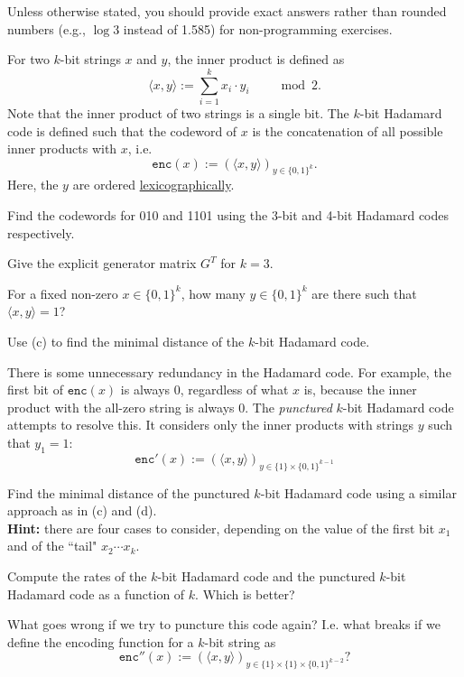 \documentclass[a4paper,10pt,landscape,twocolumn]{scrartcl}
\begin{document}
\homeworkproblems

{\sffamily\noindent
Unless otherwise stated, you should provide exact answers rather than rounded numbers (e.g., $\log 3$ instead of 1.585) for non-programming exercises.
}

\newcommand{\ip}[2]{\langle #1, #2\rangle}
\begin{exercise}
For two $k$-bit strings $x$ and $y$, the inner product is defined as
\[
\ip{x}{y} := \sum_{i=1}^k x_i\cdot y_i \ \ \ \ \ \ \ \ \mod 2.
\]
Note that the inner product of two strings is a single bit. The $k$-bit Hadamard code is defined such that the codeword of $x$ is the concatenation of all possible inner products with $x$, i.e.
\[
\mathtt{enc}(x) := \left(\ip{x}{y}\right)_{y \in \{0,1\}^k}.
\]
Here, the $y$ are ordered \href{https://en.wikipedia.org/wiki/Lexicographical_order}{lexicographically}.
	\begin{subex}[(1pt)]
	Find the codewords for 010 and 1101 using the 3-bit and 4-bit Hadamard codes respectively.
	\end{subex}
	\begin{subex}[(1pt)]
	Give the explicit generator matrix $G^T$ for $k = 3$.
	\end{subex}
	\begin{subex}[(2pt)]
	For a fixed non-zero $x \in \{0,1\}^k$, how many $y \in \{0,1\}^k$ are there such that $\ip{x}{y} = 1$?
	\end{subex}
	\begin{subex}[(1pt)]
	Use (c) to find the minimal distance of the $k$-bit Hadamard code.
	\end{subex}
There is some unnecessary redundancy in the Hadamard code. For example, the first bit of $\mathtt{enc}(x)$ is always 0, regardless of what $x$ is, because the inner product with the all-zero string is always 0. The \emph{punctured} $k$-bit Hadamard code attempts to resolve this. It considers only the inner products with strings $y$ such that $y_1 = 1$:
\[
\mathtt{enc}'(x) := \left(\ip{x}{y}\right)_{y \in \{1\} \times \{0,1\}^{k-1}}
\]
	\begin{subex}[(3pt)]
	Find the minimal distance of the punctured $k$-bit Hadamard code using a similar approach as in (c) and (d).
	\\\textbf{Hint:} there are four cases to consider, depending on the value of the first bit $x_1$ and of the ``tail" $x_2\cdots x_k$.
	\end{subex}
	\begin{subex}[(2pt)]
	Compute the rates of the $k$-bit Hadamard code and the punctured $k$-bit Hadamard code as a function of $k$. Which is better?
	\end{subex}
	\begin{subex}[(1pt)]
	What goes wrong if we try to puncture this code again? I.e. what breaks if we define the encoding function for a $k$-bit string as
	\[
	\mathtt{enc}''(x) := \left(\ip{x}{y}\right)_{y \in \{1\} \times \{1\} \times \{0,1\}^{k-2}}?
	\]
	\end{subex}
\end{exercise}
\end{document}
